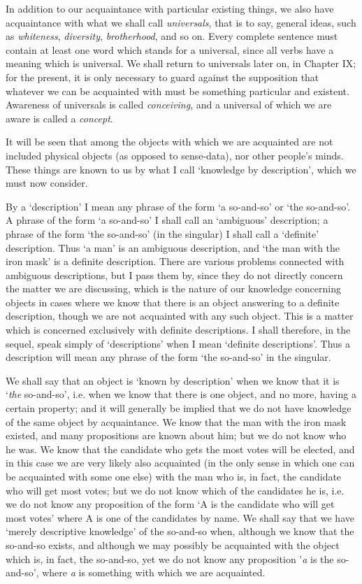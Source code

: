 \documentclass[oneside,letterpaper,12pt]{book}
\begin{document}
In addition to our acquaintance with particular existing things, we also
have acquaintance with what we shall call \emph{universals}, that is to
say, general ideas, such as \emph{whiteness}, \emph{diversity},
\emph{brotherhood}, and so on. Every complete sentence must contain at
least one word which stands for a universal, since all verbs have a
meaning which is universal. We shall return to universals later on, in
Chapter IX; for the present, it is only necessary to guard against the
supposition that whatever we can be acquainted with must be something
particular and existent. Awareness of universals is called
\emph{conceiving}, and a universal of which we are aware is called a
\emph{concept}.

It will be seen that among the objects with which we are acquainted are
not included physical objects (as opposed to sense-data), nor other
people's minds. These things are known to us by what I
call `knowledge by description', which we
must now consider.

By a `description' I mean any phrase of
the form `a so-and-so' or
`the so-and-so'. A phrase of the form
`a so-and-so' I shall call an
`ambiguous' description; a phrase of
the form `the so-and-so' (in the
singular) I shall call a `definite'
description. Thus `a man' is an
ambiguous description, and `the man with the iron
mask' is a definite description. There are various
problems connected with ambiguous descriptions, but I pass them by,
since they do not directly concern the matter we are discussing, which
is the nature of our knowledge concerning objects in cases where we know
that there is an object answering to a definite description, though we
are not acquainted with any such object. This is a matter which is
concerned exclusively with definite descriptions. I shall therefore, in
the sequel, speak simply of
`descriptions' when I mean
`definite descriptions'. Thus a
description will mean any phrase of the form `the
so-and-so' in the singular.

We shall say that an object is `known by
description' when we know that it is
`\emph{the} so-and-so', i.e. when we know that
there is one object, and no more, having a certain property; and it will
generally be implied that we do not have knowledge of the same object by
acquaintance. We know that the man with the iron mask existed, and many
propositions are known about him; but we do not know who he was. We know
that the candidate who gets the most votes will be elected, and in this
case we are very likely also acquainted (in the only sense in which one
can be acquainted with some one else) with the man who is, in fact, the
candidate who will get most votes; but we do not know which of the
candidates he is, i.e. we do not know any proposition of the form
`A is the candidate who will get most
votes' where A is one of the candidates by name. We
shall say that we have `merely descriptive
knowledge' of the so-and-so when, although we know that
the so-and-so exists, and although we may possibly be acquainted with
the object which is, in fact, the so-and-so, yet we do not know any
proposition '\emph{a} is the so-and-so',
where \emph{a} is something with which we are acquainted.
\end{document}
